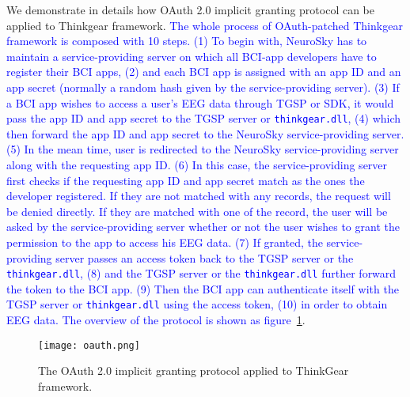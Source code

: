 We demonstrate in details how OAuth 2.0 implicit granting protocol can be applied to Thinkgear framework.  \textcolor{blue}{The whole process of OAuth-patched Thinkgear framework is composed with 10 steps. (1) To begin with, NeuroSky has to maintain a service-providing server on which all BCI-app developers have to register their BCI apps, (2) and each BCI app is assigned with an app ID and an app secret (normally a random hash given by the service-providing server). (3) If a BCI app wishes to access a user's EEG data through TGSP or SDK, it would pass the app ID and app secret to the TGSP server or \texttt{thinkgear.dll}, (4) which then forward the app ID and app secret to the NeuroSky service-providing server. (5) In the mean time, user is redirected to the NeuroSky service-providing server along with the requesting app ID. (6) In this case, the service-providing server first checks if the requesting app ID and app secret match as the ones the developer registered. If they are not matched with any records, the request will be denied directly. If they are matched with one of the record, the user will be asked by the service-providing server whether or not the user wishes to grant the permission to the app to access his EEG data. (7) If granted, the service-providing server passes an access token back to the TGSP server or the \texttt{thinkgear.dll}, (8) and the TGSP server or the \texttt{thinkgear.dll} further forward the token to the BCI app. (9) Then the BCI app can authenticate itself with the TGSP server or \texttt{thinkgear.dll} using the access token, (10) in order to obtain EEG data. The overview of the protocol is shown as figure~\ref{fig:oauth}}.

\begin{figure}[!htb]
\hspace*{2cm}
        \texttt{[image: oauth.png]}
	\caption{The OAuth 2.0 implicit granting protocol applied to ThinkGear framework. }
        \label{fig:oauth}
\end{figure}

